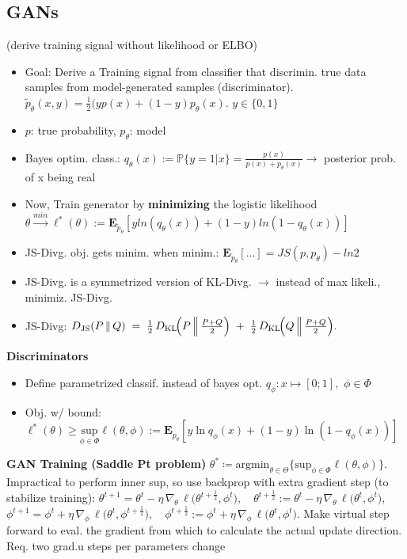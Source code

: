 \subsection{GANs} (derive training signal without likelihood or ELBO)
\begin{itemize}
    \item Goal: Derive a Training signal from classifier that discrimin. true data samples from model-generated samples (discriminator). \(\tilde{p}_\theta(x,y)=\frac{1}{2}(yp(x)+(1-y)p_\theta(x)\). \(y\in \{0,1\}\)
    \item \(p\): true probability, \(p_\theta\): model
    \item Bayes optim. class.: \(q_\theta(x) :=\mathbb{P}\{y=1|x\}=\frac{p(x)}{p(x)+p_\theta(x)}\rightarrow\) posterior prob. of x being real
    \item Now, Train generator by \textbf{minimizing} the logistic likelihood \(\theta \overset{min}{\rightarrow} \ell^*(\theta):=\mathbf{E}_{\tilde{p}_\theta}[yln(q_\theta(x))+(1-y)ln(1-q_\theta(x)) ]\)
    \item JS-Divg. obj. gets minim. when minim.: \(\mathbf{E}_{\tilde{p}_\theta}[\dots]= JS(p,p_\theta)-ln2\)
    \item JS-Divg. is a symmetrized version of KL-Divg. \(\rightarrow \) instead of max likeli., minimiz. JS-Divg.
    \item JS-Divg: \(
D_{\mathrm{JS}}(P \,\|\, Q)
\;=\;
\tfrac12\,D_{\mathrm{KL}}\!\Bigl(P \,\Big\|\,
  \tfrac{P + Q}{2}\Bigr)
\;+\;
\tfrac12\,D_{\mathrm{KL}}\!\Bigl(Q \,\Big\|\,
  \tfrac{P + Q}{2}\Bigr).
\)

\end{itemize}
\textbf{Discriminators}
\begin{itemize}
    \item Define parametrized classif. instead of bayes opt. \(q_\phi:x\mapsto[0;1],\) \(\phi\in \Phi\)
    \item Obj. w/ bound:\(\ell^*(\theta) \geq \underset{\phi\in\Phi}{\text{sup}}\ell(\theta,\phi):= \mathbf{E}_{\tilde{p}_\theta}[y\ln q_\phi(x)+(1-y)\ln(1-q_\phi(x))]\)
\end{itemize}
\textbf{GAN Training (Saddle Pt problem)}
$\theta^*\coloneqq\text{argmin}_{\theta \in \Theta} \{{\text{sup}_{\phi\in\Phi}}\ell (\theta,\phi)\}$. Impractical to perform inner sup, so use backprop with extra gradient step (to stabilize training):
$
\theta^{t+1}
= \theta^t - \eta\,\nabla_{\theta}\,\ell\bigl(\theta^{t+\tfrac{1}{2}}, \phi^t\bigr),
\quad
\theta^{t+\tfrac{1}{2}} := \theta^t - \eta\,\nabla_{\theta}\,\ell\bigl(\theta^t, \phi^t\bigr), \;$ 
$
\phi^{t+1}= \phi^t + \eta\,\nabla_{\phi}\,\ell\bigl(\theta^t, \phi^{t+\tfrac{1}{2}}\bigr),
\quad
\phi^{t+\tfrac{1}{2}} := \phi^t + \eta\,\nabla_{\phi}\,\ell\bigl(\theta^t, \phi^t\bigr).
$
\textrightarrow Make virtual step forward to eval. the gradient from which to calculate the actual update direction. Req. two grad.u steps per parameters change
